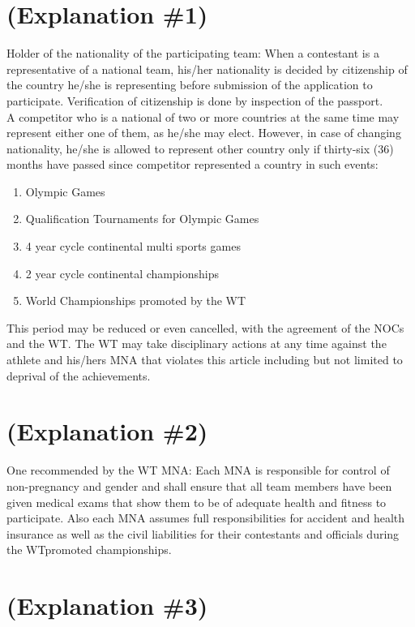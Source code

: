 \documentclass[
]{report}
\providecommand{\tightlist}{%
  \setlength{\itemsep}{0pt}\setlength{\parskip}{0pt}}
\renewcommand{\labelenumi}{\arabic{enumi}}
\begin{document}
\section{(Explanation \#1)}\label{explanation-1-1}

Holder of the nationality of the participating team: When a contestant
is a representative of a national team, his/her nationality is decided
by citizenship of the country he/she is representing before submission
of the application to participate. Verification of citizenship is done
by inspection of the passport.\\
A competitor who is a national of two or more countries at the same time
may represent either one of them, as he/she may elect. However, in case
of changing nationality, he/she is allowed to represent other country
only if thirty-six (36) months have passed since competitor represented
a country in such events:

\begin{enumerate}
\def\labelenumi{\roman{enumi})}
\tightlist
\item
  Olympic Games
\item
  Qualification Tournaments for Olympic Games
\item
  4 year cycle continental multi sports games
\item
  2 year cycle continental championships
\item
  World Championships promoted by the WT
\end{enumerate}

This period may be reduced or even cancelled, with the agreement of the
NOCs and the WT. The WT may take disciplinary actions at any time
against the athlete and his/hers MNA that violates this article
including but not limited to deprival of the achievements.

\section{(Explanation \#2)}\label{explanation-2-1}

One recommended by the WT MNA: Each MNA is responsible for control of
non-pregnancy and gender and shall ensure that all team members have
been given medical exams that show them to be of adequate health and
fitness to participate. Also each MNA assumes full responsibilities for
accident and health insurance as well as the civil liabilities for their
contestants and officials during the WTpromoted championships.

\section{(Explanation \#3)}\label{explanation-3-1}
\end{document}

